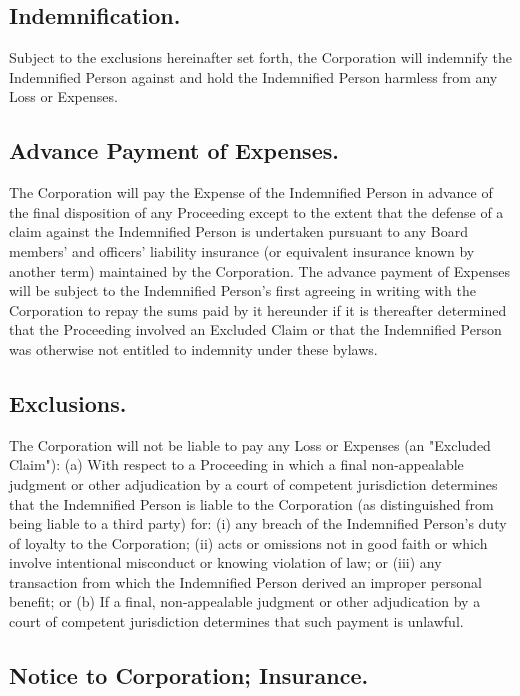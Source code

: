 \documentclass[11pt,american,letterpaper,]{constitution}
\begin{document}
\subsection{Indemnification.} 

Subject to the exclusions hereinafter set forth, the Corporation will indemnify the Indemnified Person against and hold the Indemnified Person harmless from any Loss or Expenses.

\subsection{Advance Payment of Expenses.} 

The Corporation will pay the Expense of the Indemnified Person in advance of the final disposition of any Proceeding except to the extent that the defense of a claim against the Indemnified Person is undertaken pursuant to any Board members' and officers' liability insurance (or equivalent insurance known by another term) maintained by the Corporation. The advance payment of Expenses will be subject to the Indemnified Person's first agreeing in writing with the Corporation to repay the sums paid by it hereunder if it is thereafter determined that the Proceeding involved an Excluded Claim or that the Indemnified Person was otherwise not entitled to indemnity under these bylaws.

\subsection{Exclusions.} 

The Corporation will not be liable to pay any Loss or Expenses (an "Excluded Claim"): (a) With respect to a Proceeding in which a final non-appealable judgment or other adjudication by a court of competent jurisdiction determines that the Indemnified Person is liable to the Corporation (as distinguished from being liable to a third party) for: (i) any breach of the Indemnified Person's duty of loyalty to the Corporation; (ii) acts or omissions not in good faith or which involve  intentional misconduct or knowing violation of law; or (iii) any transaction from which the Indemnified Person derived an improper personal benefit; or (b) If a final, non-appealable judgment or other adjudication by a court of competent jurisdiction determines that such payment is unlawful.

\subsection{Notice to Corporation; Insurance.} 
\end{document}
